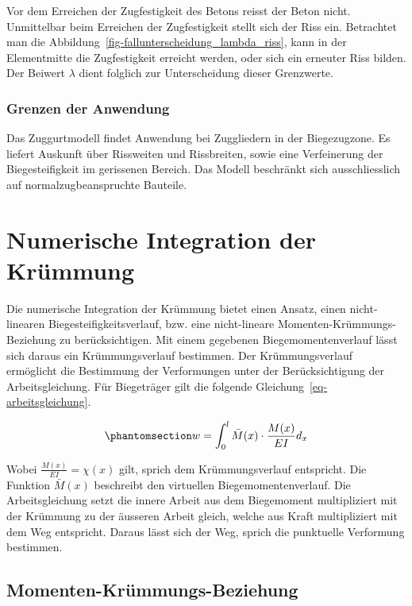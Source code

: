 \documentclass[
  12pt,
  letterpaper,
  egregdoesnotlikesansseriftitles]{scrreprt}
\begin{document}
Vor dem Erreichen der Zugfestigkeit des Betons reisst der Beton nicht.
Unmittelbar beim Erreichen der Zugfestigkeit stellt sich der Riss ein.
Betrachtet man die Abbildung~\ref{fig-fallunterscheidung_lambda_riss},
kann in der Elementmitte die Zugfestigkeit erreicht werden, oder sich
ein erneuter Riss bilden. Der Beiwert \(\lambda\) dient folglich zur
Unterscheidung dieser Grenzwerte.

\subsubsection{Grenzen der Anwendung}\label{grenzen-der-anwendung-1}

Das Zuggurtmodell findet Anwendung bei Zuggliedern in der Biegezugzone.
Es liefert Auskunft über Rissweiten und Rissbreiten, sowie eine
Verfeinerung der Biegesteifigkeit im gerissenen Bereich. Das Modell
beschränkt sich ausschliesslich auf normalzugbeanspruchte Bauteile.

\section{Numerische Integration der Krümmung}\label{sec-numint}

Die numerische Integration der Krümmung bietet einen Ansatz, einen
nicht-linearen Biegesteifigkeitsverlauf, bzw. eine nicht-lineare
Momenten-Krümmungs-Beziehung zu berücksichtigen. Mit einem gegebenen
Biegemomentenverlauf lässt sich daraus ein Krümmungsverlauf bestimmen.
Der Krümmungsverlauf ermöglicht die Bestimmung der Verformungen unter
der Berücksichtigung der Arbeitsgleichung. Für Biegeträger gilt die
folgende Gleichung~\ref{eq-arbeitsgleichung}.

\begin{equation}\phantomsection\label{eq-arbeitsgleichung}{
w = \int_0^l \bar{M}(x) \cdot \frac{M(x)}{EI} d_x
}\end{equation}

Wobei \(\frac{M(x)}{EI} = \chi(x)\) gilt, sprich dem Krümmungsverlauf
entspricht. Die Funktion \(\bar{M}(x)\) beschreibt den virtuellen
Biegemomentenverlauf. Die Arbeitsgleichung setzt die innere Arbeit aus
dem Biegemoment multipliziert mit der Krümmung zu der äusseren Arbeit
gleich, welche aus Kraft multipliziert mit dem Weg entspricht. Daraus
lässt sich der Weg, sprich die punktuelle Verformung bestimmen.

\subsection{Momenten-Krümmungs-Beziehung}\label{momenten-kruxfcmmungs-beziehung}
\end{document}
